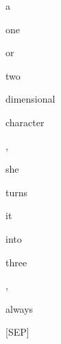 \documentclass[varwidth=150mm]{standalone}
\begin{document}
\begin{CJK*}{UTF8}{gbsn}
{{{\colorbox{red!1.6731921434402466}{\strut a} \colorbox{red!0.0}{\strut one} \colorbox{red!1.4448273181915283}{\strut or} \colorbox{red!0.0}{\strut two} \colorbox{red!2.665055990219116}{\strut dimensional} \colorbox{red!4.776886463165283}{\strut character} \colorbox{red!0.0}{\strut ,} \colorbox{red!1.9811232089996338}{\strut she} \colorbox{red!0.0}{\strut turns} \colorbox{red!0.0}{\strut it} \colorbox{red!0.0}{\strut into} \colorbox{red!0.0}{\strut three} \colorbox{red!7.759969234466553}{\strut ,} \colorbox{red!4.963420867919922}{\strut always} \colorbox{red!23.49762535095215}{\strut [SEP]}
}}}
\end{CJK*}
\end{document}
